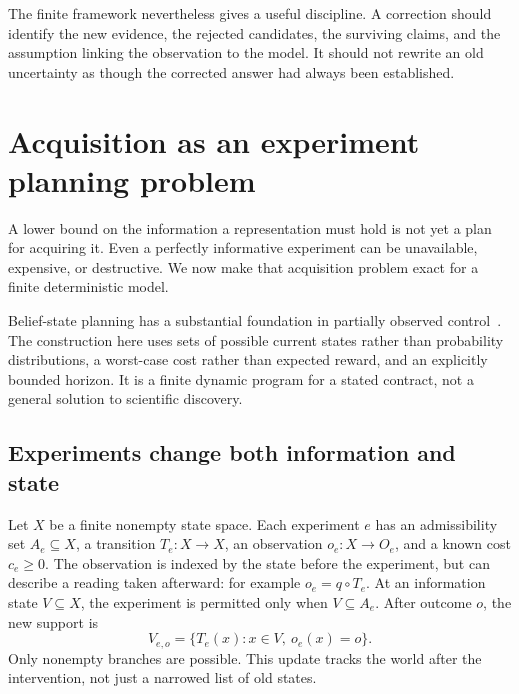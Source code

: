 The finite framework nevertheless gives a useful discipline. A correction should identify the new evidence, the rejected candidates, the surviving claims, and the assumption linking the observation to the model. It should not rewrite an old uncertainty as though the corrected answer had always been established.

\section{Acquisition as an experiment planning problem}\label{MU:sec:acquisition}
A lower bound on the information a representation must hold is not yet a plan for acquiring it. Even a perfectly informative experiment can be unavailable, expensive, or destructive. We now make that acquisition problem exact for a finite deterministic model.

Belief-state planning has a substantial foundation in partially observed control~\cite{MU:smallwood}. The construction here uses sets of possible current states rather than probability distributions, a worst-case cost rather than expected reward, and an explicitly bounded horizon. It is a finite dynamic program for a stated contract, not a general solution to scientific discovery.

\subsection{Experiments change both information and state}
Let $X$ be a finite nonempty state space. Each experiment $e$ has an admissibility set $A_e\subseteq X$, a transition $T_e:X\to X$, an observation $o_e:X\to O_e$, and a known cost $c_e\geq0$. The observation is indexed by the state before the experiment, but can describe a reading taken afterward: for example $o_e=q\circ T_e$. At an information state $V\subseteq X$, the experiment is permitted only when $V\subseteq A_e$. After outcome $o$, the new support is
\begin{equation}\label{MU:eq:acquisition-update}
V_{e,o}=\{T_e(x):x\in V,\ o_e(x)=o\}.
\end{equation}
Only nonempty branches are possible. This update tracks the world after the intervention, not just a narrowed list of old states.

